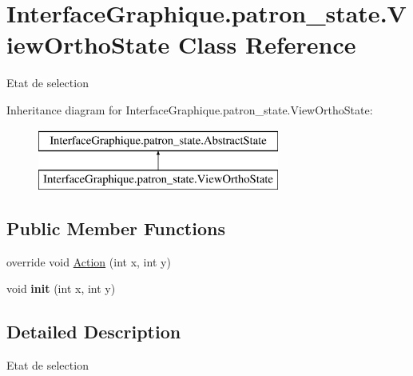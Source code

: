 \hypertarget{class_interface_graphique_1_1patron__state_1_1_view_ortho_state}{\section{Interface\-Graphique.\-patron\-\_\-state.\-View\-Ortho\-State Class Reference}
\label{class_interface_graphique_1_1patron__state_1_1_view_ortho_state}
}


Etat de selection  


Inheritance diagram for Interface\-Graphique.\-patron\-\_\-state.\-View\-Ortho\-State\-:\begin{figure}[H]
\begin{center}
\leavevmode
\includegraphics[height=2.000000cm]{class_interface_graphique_1_1patron__state_1_1_view_ortho_state}
\end{center}
\end{figure}
\subsection*{Public Member Functions}
\begin{DoxyCompactItemize}
\item 
override void \hyperlink{class_interface_graphique_1_1patron__state_1_1_view_ortho_state_aae857294a6d4030392e0009f869bb46e}{Action} (int x, int y)
\item 
\hypertarget{class_interface_graphique_1_1patron__state_1_1_view_ortho_state_a960740557ec3c5ba94e972efc122eb8d}{void {\bfseries init} (int x, int y)}\label{class_interface_graphique_1_1patron__state_1_1_view_ortho_state_a960740557ec3c5ba94e972efc122eb8d}

\end{DoxyCompactItemize}


\subsection{Detailed Description}
Etat de selection 



